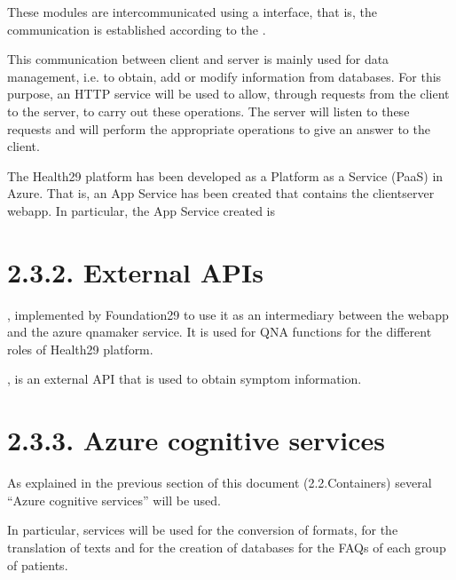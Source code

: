 \documentclass[letterpaper,10pt,english]{sphinxmanual}
\begin{document}
These modules are intercommunicated using a  interface, that is, the communication is established according to the .

This communication between client and server is mainly used for data management, i.e. to obtain, add or modify information from databases.
For this purpose, an HTTP service will be used to allow, through requests from the client to the server, to carry out these operations. The server will listen to these requests and will perform the appropriate operations to give an answer to the client.

The Health29 platform has been developed as a Platform as a Service (PaaS) in Azure. That is, an App Service has been created that contains the client\sphinxhyphen{}server webapp. In particular, the App Service created is 


\section{2.3.2. External APIs}
\label{\detokenize{pages/SW/Components:external-apis}}
, implemented by Foundation29 to use it as an intermediary between the webapp and the azure qnamaker service. It is used for QNA functions for the different roles of Health29 platform.



, is an external API that is used to obtain symptom information.




\section{2.3.3. Azure cognitive services}
\label{\detokenize{pages/SW/Components:azure-cognitive-services}}
As explained in the previous section of this document (2.2.Containers) several “Azure cognitive services” will be used.

In particular, services will be used for the conversion of formats, for the translation of texts and for the creation of databases for the FAQs of each group of patients.
\end{document}
